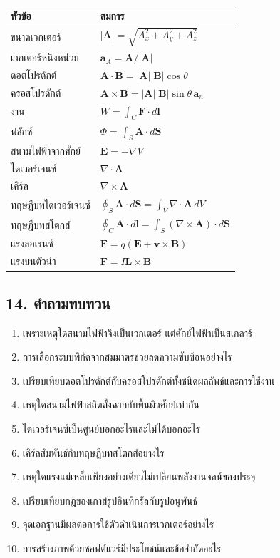 \begin{table}[htbp]
    \centering
    \begin{tabular}{l l}
        \hline
        \textbf{หัวข้อ} & \textbf{สมการ} \\
        \hline
        ขนาดเวกเตอร์ & \(|\mathbf{A}|=\sqrt{A_x^2+A_y^2+A_z^2}\) \\
        เวกเตอร์หนึ่งหน่วย & \(\mathbf{a}_A=\mathbf{A}/|\mathbf{A}|\) \\
        ดอตโปรดักต์ & \(\mathbf{A}\cdot\mathbf{B}=|\mathbf{A}||\mathbf{B}|\cos\theta\) \\
        ครอสโปรดักต์ & \(\mathbf{A}\times\mathbf{B}=|\mathbf{A}||\mathbf{B}|\sin\theta\,\mathbf{a}_n\) \\
        งาน & \(W=\int_C\mathbf{F}\cdot d\mathbf{l}\) \\
        ฟลักซ์ & \(\Phi=\int_S\mathbf{A}\cdot d\mathbf{S}\) \\
        สนามไฟฟ้าจากศักย์ & \(\mathbf{E}=-\nabla V\) \\
        ไดเวอร์เจนซ์ & \(\nabla\cdot\mathbf{A}\) \\
        เคิร์ล & \(\nabla\times\mathbf{A}\) \\
        ทฤษฎีบทไดเวอร์เจนซ์ & \(\oint_S\mathbf{A}\cdot d\mathbf{S}=\int_V\nabla\cdot\mathbf{A}\,dV\) \\
        ทฤษฎีบทสโตกส์ & \(\oint_C\mathbf{A}\cdot d\mathbf{l}=\int_S(\nabla\times\mathbf{A})\cdot d\mathbf{S}\) \\
        แรงลอเรนซ์ & \(\mathbf{F}=q(\mathbf{E}+\mathbf{v}\times\mathbf{B})\) \\
        แรงบนตัวนำ & \(\mathbf{F}=I\mathbf{L}\times\mathbf{B}\) \\
        \hline
    \end{tabular}
\end{table}

\subsection{14. คำถามทบทวน}

\begin{enumerate}
\item เพราะเหตุใดสนามไฟฟ้าจึงเป็นเวกเตอร์ แต่ศักย์ไฟฟ้าเป็นสเกลาร์
\item การเลือกระบบพิกัดจากสมมาตรช่วยลดความซับซ้อนอย่างไร
\item เปรียบเทียบดอตโปรดักต์กับครอสโปรดักต์ทั้งชนิดผลลัพธ์และการใช้งาน
\item เหตุใดสนามไฟฟ้าสถิตตั้งฉากกับพื้นผิวศักย์เท่ากัน
\item ไดเวอร์เจนซ์เป็นศูนย์บอกอะไรและไม่ได้บอกอะไร
\item เคิร์ลสัมพันธ์กับทฤษฎีบทสโตกส์อย่างไร
\item เหตุใดแรงแม่เหล็กเพียงอย่างเดียวไม่เปลี่ยนพลังงานจลน์ของประจุ
\item เปรียบเทียบกฎของเกาส์รูปอินทิกรัลกับรูปอนุพันธ์
\item จุดเอกฐานมีผลต่อการใช้ตัวดำเนินการเวกเตอร์อย่างไร
\item การสร้างภาพด้วยซอฟต์แวร์มีประโยชน์และข้อจำกัดอะไร
\end{enumerate}

